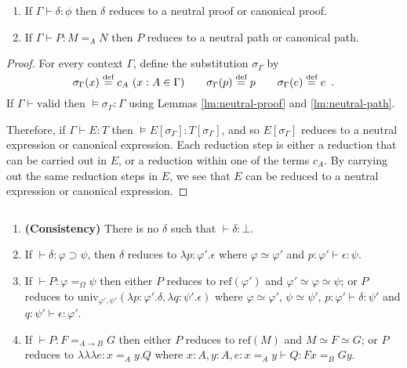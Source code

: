 \documentclass[a4paper,UKenglish]{lipics-v2016}
\newcommand*{\eqdef}{\mathrel{\smash{\stackrel{\text{def}}{=}}}}
\newcommand*{\reff}[1]{\ensuremath{\mathrm{ref} \left( {#1} \right)}}
\newcommand*{\univ}[4]{\ensuremath{\mathrm{univ}_{{#1}, {#2}} \left({#3} , {#4} \right)}}
\newcommand*{\triplelambda}{\ensuremath{\lambda \!\! \lambda \!\! \lambda}}
\newcommand*{\vald}{\ensuremath{\vdash \mathrm{valid}}}
\theoremstyle{plain}
\theoremstyle{definition}
\begin{document}
\begin{corollary}
\begin{enumerate}
\item
If $\Gamma \vdash \delta : \phi$ then $\delta$ reduces to a neutral proof or canonical proof.
\item
If $\Gamma \vdash P : M =_A N$ then $P$ reduces to a neutral path or canonical path.
\end{enumerate}
\end{corollary}

\begin{proof}
For every context $\Gamma$, define the substitution $\sigma_\Gamma$ by
\[ \sigma_\Gamma(x) \eqdef c_A \ (x : A \in \Gamma) \qquad \sigma_\Gamma(p) \eqdef p \qquad \sigma_\Gamma(e) \eqdef e \enspace . \]
If $\Gamma \vald$ then $\models \sigma_\Gamma : \Gamma$ using Lemmas \ref{lm:neutral-proof} and \ref{lm:neutral-path}.

Therefore, if $\Gamma \vdash E : T$ then $\models E [ \sigma_\Gamma ] : T [ \sigma_\Gamma ]$, and so $E [ \sigma_\Gamma ]$ reduces to
a neutral expression or canonical expression.  Each reduction step is either a reduction that can be carried out in $E$, or a reduction
within one of the terms $c_A$.  By carrying out the same reduction steps in $E$, we see that $E$ can be reduced to a neutral expression or canonical
expression.
\end{proof}

\begin{corollary}[Canonicity]
$ $
\begin{enumerate}
\item
\textbf{(Consistency)}
There is no $\delta$ such that $\vdash \delta : \bot$.
\item
If $\vdash \delta : \varphi \supset \psi$, then $\delta$ reduces to $\lambda p : \varphi' . \epsilon$ where $\varphi \simeq \varphi'$ and
$p : \varphi' \vdash \epsilon : \psi$.
\item
If $\vdash P : \varphi =_\Omega \psi$ then either $P$ reduces to $\reff{\varphi'}$ and $\varphi' \simeq \varphi \simeq \psi$; or
$P$ reduces to $\univ{\varphi'}{\psi'}{\lambda p:\varphi'.\delta}{\lambda q:\psi'.\epsilon}$ where $\varphi \simeq \varphi'$, $\psi \simeq \psi'$,
$p : \varphi' \vdash \delta : \psi'$ and $q : \psi' \vdash \epsilon : \varphi'$.
\item
If $\vdash P : F =_{A \rightarrow B} G$ then either $P$ reduces to $\reff{M}$ and $M \simeq F \simeq G$; or $P$ reduces to
$\triplelambda e:x =_A y.Q$ where $x : A, y : A, e : x =_A y \vdash Q : F x =_B G y$.
\end{enumerate}
\end{corollary}
\end{document}
